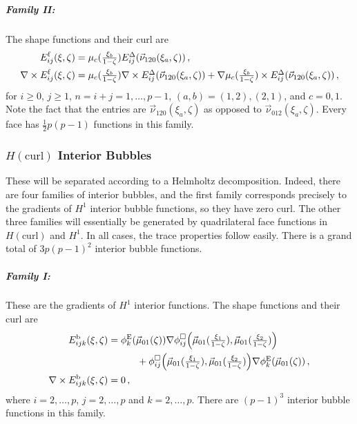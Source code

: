 \subparagraph{Family II:} 
The shape functions and their curl are
\begin{equation}
	\begin{aligned}
		E_{ij}^{\mathrm{f}}(\xi,\zeta)&=\mu_c(\textstyle{\frac{\xi_b}{1-\zeta}})E_{ij}^\Delta(\vec{\nu}_{120}(\xi_a,\zeta))\,,\\
		\nabla\times E_{ij}^{\mathrm{f}}(\xi,\zeta)&=\mu_c(\textstyle{\frac{\xi_b}{1-\zeta}})\nabla\times E_{ij}^\Delta(\vec{\nu}_{120}(\xi_a,\zeta))
			+\nabla\mu_c(\textstyle{\frac{\xi_b}{1-\zeta}})\times E_{ij}^\Delta(\vec{\nu}_{120}(\xi_a,\zeta))\,,
	\end{aligned}
	\label{eq:PyrHcurlTriaFaceII}
\end{equation}
for $i\geq0$, $j\geq1$, $n=i+j=1,\ldots,p-1$, $(a,b)=(1,2),(2,1)$, and $c=0,1$. 
Note the fact that the entries are $\vec{\nu}_{120}(\xi_a,\zeta)$ as opposed to $\vec{\nu}_{012}(\xi_a,\zeta)$.
Every face has $\frac{1}{2}p(p-1)$ functions in this family.

\subsubsection{\texorpdfstring{$H(\mathrm{curl})$}{Hcurl} Interior Bubbles}

These will be separated according to a Helmholtz decomposition.
Indeed, there are four families of interior bubbles, and the first family corresponds precisely to the gradients of $H^1$ interior bubble functions, so they have zero curl.
The other three families will essentially be generated by quadrilateral face functions in $H(\mathrm{curl})$ and $H^1$.
In all cases, the trace properties follow easily.
There is a grand total of $3p(p-1)^2$ interior bubble functions.

\subparagraph{Family I:}
These are the gradients of $H^1$ interior functions.
The shape functions and their curl are
\begin{equation}
	\begin{aligned}
		E_{ijk}^\mathrm{b}(\xi,\zeta)&=\phi_k^{\mathrm{E}}(\vec{\mu}_{01}(\zeta))
    			\nabla\phi_{ij}^\square\Big(\vec{\mu}_{01}(\textstyle{\frac{\xi_1}{1-\zeta}}),\vec{\mu}_{01}(\textstyle{\frac{\xi_2}{1-\zeta}})\Big)\\
        		&\quad\qquad+\phi_{ij}^\square\Big(\vec{\mu}_{01}(\textstyle{\frac{\xi_1}{1-\zeta}}),\vec{\mu}_{01}(\textstyle{\frac{\xi_2}{1-\zeta}})\Big)\nabla\phi_k^{\mathrm{E}}(\vec{\mu}_{01}(\zeta))\,,\\
    \nabla\times E_{ijk}^\mathrm{b}(\xi,\zeta)&=0\,,
	\end{aligned}
	\label{eq:PyrHcurlInteriorI}
\end{equation}
where $i=2,\ldots,p$, $j=2,\ldots,p$ and $k=2,\ldots,p$.
There are $(p-1)^3$ interior bubble functions in this family.

